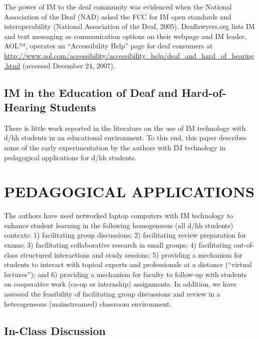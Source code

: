 \documentclass[11.5pt]{sig-alternate} %
\begin{document}
\begin{large}
The power of IM to the deaf community was evidenced when the National Association of the Deaf (NAD) asked the FCC for IM open standards and interoperability (National Association of the Deaf, 2005). Deaflawyers.org lists IM and text messaging as communication options on their webpage and IM leader, AOL™, operates an ``Accessibility Help'' page for deaf consumers at \url{http://www.aol.com/accessibility/accessibility_help/deaf_and_hard_of_hearing.html} (accessed December 24, 2007). 

\subsection*{IM in the Education of Deaf and Hard-of-Hearing Students}

There is little work reported in the literature on the use of IM technology with d/hh students in an educational environment. To this end, this paper describes some of the early experimentation by the authors with IM technology in pedagogical applications for d/hh students. 

\section*{PEDAGOGICAL APPLICATIONS}

The authors have used networked laptop computers with IM technology to enhance student learning in the following homogeneous (all d/hh students) contexts: 1) facilitating group discussions; 2) facilitating review preparation for exams; 3) facilitating collaborative research in small groups; 4) facilitating out-of-class structured interactions and study sessions; 5) providing a mechanism for students to interact with topical experts and professionals at a distance (“virtual lectures”); and 6) providing a mechanism for faculty to follow-up with students on cooperative work (co-op or internship) assignments. In addition, we have assessed the feasibility of facilitating group discussions and review in a heterogeneous (mainstreamed) classroom environment. 

\subsection*{In-Class Discussion}


\end{large}
\end{document}
